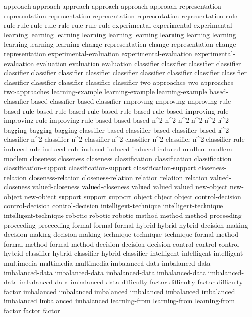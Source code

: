 approach	approach	approach	approach	approach	approach	
representation	representation	representation	representation	representation	representation	
rule	rule	rule	rule	rule	rule	rule	rule	rule	
experimental	experimental	experimental	
learning	learning	learning	learning	learning	learning	learning	learning	learning	learning	learning	learning	
change-representation	change-representation	change-representation	
experimental-evaluation	experimental-evaluation	experimental-evaluation	
evaluation	evaluation	evaluation	
classifier	classifier	classifier	classifier	classifier	classifier	classifier	classifier	classifier	classifier	classifier	classifier	classifier	classifier	classifier	classifier	classifier	classifier	
two-approaches	two-approaches	two-approaches	
learning-example	learning-example	learning-example	
based-classifier	based-classifier	based-classifier	
improving	improving	improving	
rule-based	rule-based	rule-based	rule-based	rule-based	rule-based	
improving-rule	improving-rule	improving-rule	
based	based	based	
n^2	n^2	n^2	n^2	n^2	n^2	
bagging	bagging	bagging	
classifier-based	classifier-based	classifier-based	
n^2-classifier	n^2-classifier	n^2-classifier	n^2-classifier	n^2-classifier	n^2-classifier	
rule-induced	rule-induced	rule-induced	
induced	induced	induced	
modlem	modlem	modlem	
closeness	closeness	closeness	
classification	classification	classification	
classification-support	classification-support	classification-support	
closeness-relation	closeness-relation	closeness-relation	
relation	relation	relation	
valued-closeness	valued-closeness	valued-closeness	
valued	valued	valued	
new-object	new-object	new-object	
support	support	support	
object	object	object	
control-decision	control-decision	control-decision	
intelligent-technique	intelligent-technique	intelligent-technique	
robotic	robotic	robotic	
method	method	method	
proceeding	proceeding	proceeding	
formal	formal	formal	
hybrid	hybrid	hybrid	
decision-making	decision-making	decision-making	
technique	technique	technique	
formal-method	formal-method	formal-method	
decision	decision	decision	
control	control	control	
hybrid-classifier	hybrid-classifier	hybrid-classifier	
intelligent	intelligent	intelligent	
multimedia	multimedia	multimedia	
imbalanced-data	imbalanced-data	imbalanced-data	imbalanced-data	imbalanced-data	imbalanced-data	imbalanced-data	imbalanced-data	imbalanced-data	
difficulty-factor	difficulty-factor	difficulty-factor	
imbalanced	imbalanced	imbalanced	imbalanced	imbalanced	imbalanced	imbalanced	imbalanced	imbalanced	
learning-from	learning-from	learning-from	
factor	factor	factor	
